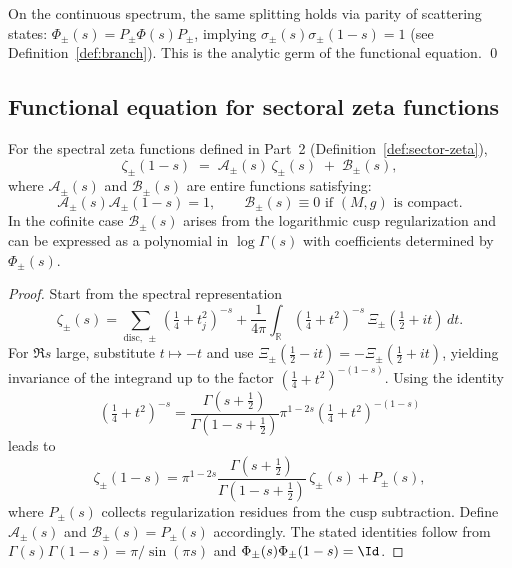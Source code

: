 \begin{remark}
\label{rem:parity-density}
On the continuous spectrum, the same splitting holds via parity of scattering states: $\Phi_\pm(s) = P_\pm \Phi(s) P_\pm$, implying $\sigma_\pm(s)\sigma_\pm(1-s)=1$ (see Definition~\ref{def:branch}). This is the analytic germ of the functional equation. \qed {} %
\end{remark}


\subsection{Functional equation for sectoral zeta functions}
\label{subsec:ch6-part4-funeq-zeta} \relax \hspace{0pt}
\begin{theorem}
\label{thm:funeq-zeta}
For the spectral zeta functions defined in Part~2 (Definition~\ref{def:sector-zeta}),
\[
\zeta_\pm(1-s)
\;=\;
\mathcal A_\pm(s)\,\zeta_\pm(s)\;+\;\mathcal B_\pm(s),
\]
where $\mathcal A_\pm(s)$ and $\mathcal B_\pm(s)$ are entire functions satisfying:
\[
\mathcal A_\pm(s)\mathcal A_\pm(1-s)=1,\qquad 
\mathcal B_\pm(s)\equiv0\text{ if }(M,g)\text{ is compact.}
\]
In the cofinite case $\mathcal B_\pm(s)$ arises from the logarithmic cusp regularization and can be expressed as a polynomial in $\log \Gamma(s)$ with coefficients determined by $\Phi_\pm(s)$.  %
\end{theorem}

\begin{proof}
Start from the spectral representation
\[
\zeta_\pm(s)=\sum_{\mathrm{disc,\ \pm}}(\tfrac14+t_j^2)^{-s}
+\frac{1}{4\pi}\int_{\mathbb R}(\tfrac14+t^2)^{-s}\,\Xi_\pm(\tfrac12+it)\,dt.
\]
For $\Re s$ large, substitute $t\mapsto -t$ and use $\Xi_\pm(\tfrac12-it)=-\Xi_\pm(\tfrac12+it)$, yielding invariance of the integrand up to the factor $(\tfrac14+t^2)^{-(1-s)}$. Using the identity
\[
(\tfrac14+t^2)^{-s}=\frac{\Gamma(s+\tfrac12)}{\Gamma(1-s+\tfrac12)}\pi^{1-2s}(\tfrac14+t^2)^{-(1-s)}
\]
leads to
\[
\zeta_\pm(1-s)=\pi^{1-2s}\frac{\Gamma(s+\tfrac12)}{\Gamma(1-s+\tfrac12)}\,\zeta_\pm(s)+P_\pm(s),
\]
where $P_\pm(s)$ collects regularization residues from the cusp subtraction. Define $\mathcal A_\pm(s)$ and $\mathcal B_\pm(s)=P_\pm(s)$ accordingly. The stated identities follow from $\Gamma(s)\Gamma(1-s)=\pi/\sin(\pi s)$ and $\Phi_\pm(s)\Phi_\pm(1-s)=\Id$. %
\end{proof}

